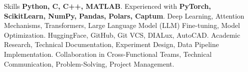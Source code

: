 

\begin{rubric}{Skills}
\entry*[Languages]
	\textbf{Python, C, C++, MATLAB}.
\entry*[Frameworks]
	Experienced with \textbf{PyTorch, ScikitLearn, NumPy, Pandas, Polars, Captum}.
	Deep Learning, Attention Mechanisms, Transformers, Large Language Model (LLM) Fine-tuning, Model Optimization.
\entry*[Tools]
	HuggingFace, GitHub, Git VCS, DIALux, AutoCAD.
	Academic Research, Technical Documentation, Experiment Design, Data Pipeline Implementation.
	Collaboration in Cross-Functional Teams, Technical Communication, Problem-Solving, Project Management.
\end{rubric}
